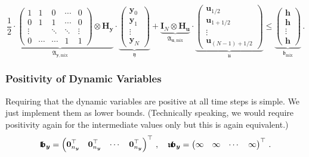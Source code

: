 \documentclass{article}
\newcommand{\tp}{\top}%
\newcommand{\kron}{\otimes}%
\newcommand{\vectorfont}[1]{\boldsymbol{#1}}%
\newcommand{\greekvectorfont}[1]{\boldsymbol{#1}}%
\newcommand{\matrixfont}[1]{\mathbf{#1}}%
\newcommand{\hvec}{\vectorfont{h}}
\newcommand{\uvec}{\vectorfont{u}}
\newcommand{\yvec}{\vectorfont{y}}
\newcommand{\bfrakvec}{\vectorfont{\mathfrak{b}}}
\newcommand{\ufrakvec}{\vectorfont{\mathfrak{u}}}
\newcommand{\yfrakvec}{\vectorfont{\mathfrak{y}}}
\newcommand{\nullvec}{\greekvectorfont{0}}
\newcommand{\lbfrakvec}{\vectorfont{\mathfrak{l\negthinspace b}}}
\newcommand{\ubfrakvec}{\vectorfont{\mathfrak{u\negthinspace b}}}
\newcommand{\Hmat}{\matrixfont{H}}
\newcommand{\Imat}{\matrixfont{I}}%
\newcommand{\Afrakmat}{\matrixfont{\mathfrak{A}}}
\begin{document}
\[
\underbrace{
\frac{1}{2} \cdot \begin{pmatrix}
	1       & 1      & 0      & \cdots  & 0 \\
	0       & 1      & 1      & \cdots  & 0 \\
	\vdots  &        & \ddots & \ddots  & \vdots \\
	0       & \cdots & \cdots &  1      & 1
\end{pmatrix}
\kron \Hmat_{\yvec}
}_{\Afrakmat_{\yvec,\mathrm{mix}}}
\cdot
\underbrace{
\begin{pmatrix}
	\yvec_0 \\ \yvec_1 \\ \vdots \\ \yvec_N
\end{pmatrix}
}_{\yfrakvec}
+
\underbrace{
\Imat_N \kron \Hmat_{\uvec}}_{\Afrakmat_{\uvec,\mathrm{mix}}}
\cdot 
\underbrace{
\begin{pmatrix}
	\uvec_{1/2} \\ \uvec_{1+1/2} \\ \vdots \\ \uvec_{(N-1)+1/2}
\end{pmatrix}
}_{\ufrakvec}
\leq 
\underbrace{
\begin{pmatrix}
	\hvec \\ \hvec\\ \vdots \\ \hvec
\end{pmatrix}
}_{\bfrakvec_{\mathrm{mix}}} \,.
\]


\subsubsection*{Positivity of Dynamic Variables}

Requiring that the dynamic variables are positive at all time steps is simple. 
We just implement them as lower bounds. 
(Technically speaking, we would require positivity again for the intermediate values only but this is again equivalent.)
\[
\lbfrakvec_{\yvec} = 
\begin{pmatrix} \nullvec_{n_{\yvec}}^{\tp} & \nullvec_{n_{\yvec}}^{\tp} & \cdots & \nullvec_{n_{\yvec}}^{\tp} \end{pmatrix}^{\tp}\,,\quad
\ubfrakvec_{\yvec}=
\begin{pmatrix} \infty & \infty & \cdots & \infty	 \end{pmatrix}^{\tp}\,.
\]


\end{document}
